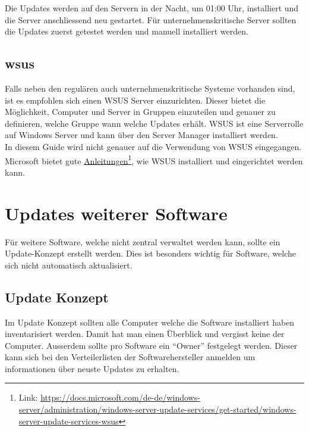 Die Updates werden auf den Servern in der Nacht, um 01:00 Uhr, installiert und die Server anschliessend neu gestartet.
Für unternehmenskritische Server sollten die Updates zuerst getestet werden und manuell installiert werden.

\subsection{\acrfull{wsus}}\label{subsec:wsus}
Falls neben den regulären auch unternehmenskritische Systeme vorhanden sind, ist es empfohlen sich einen WSUS Server einzurichten.
Dieser bietet die Möglichkeit, Computer und Server in Gruppen einzuteilen und genauer zu definieren, welche Gruppe wann welche Updates erhält.
WSUS ist eine Serverrolle auf Windows Server und kann über den Server Manager installiert werden.\\

In diesem Guide wird nicht genauer auf die Verwendung von WSUS eingegangen.
Microsoft bietet gute \href{https://docs.microsoft.com/de-de/windows-server/administration/windows-server-update-services/get-started/windows-server-update-services-wsus}{Anleitungen}\footnote{Link: \href{https://docs.microsoft.com/de-de/windows-server/administration/windows-server-update-services/get-started/windows-server-update-services-wsus}{https://docs.microsoft.com/de-de/windows-server/administration/windows-server-update-services/get-started/windows-server-update-services-wsus}}, wie WSUS installiert und eingerichtet werden kann.


\section{Updates weiterer Software}
Für weitere Software, welche nicht zentral verwaltet werden kann, sollte ein Update-Konzept erstellt werden.
Dies ist besonders wichtig für Software, welche sich nicht automatisch aktualisiert. 

\subsection{Update Konzept}
Im Update Konzept sollten alle Computer welche die Software installiert haben inventarisiert werden.
Damit hat man einen Überblick und vergisst keine der Computer.
Ausserdem sollte pro Software ein ``Owner'' festgelegt werden. 
Dieser kann sich bei den Verteilerlisten der Softwarehersteller anmelden um informationen über neuste Updates zu erhalten.
